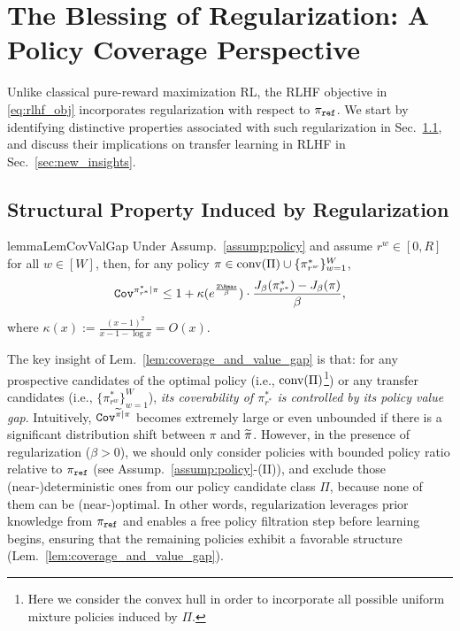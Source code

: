 \section{The Blessing of Regularization: A Policy Coverage Perspective}\label{sec:transfer_coverage_perspective}
Unlike classical pure-reward maximization RL, the RLHF objective in \eqref{eq:rlhf_obj} incorporates regularization with respect to $\pi_{\texttt{ref}}$.
We start by identifying distinctive properties associated with such regularization in Sec.~\ref{sec:new_structure}, and discuss their implications on transfer learning in RLHF in Sec.~\ref{sec:new_insights}.
%
%
%
%
%

\subsection{Structural Property Induced by Regularization}\label{sec:new_structure}
%
%
%
%
%
%
%
\begin{restatable}{lemma}{LemCovValGap}\label{lem:coverage_and_value_gap}
    Under Assump.~\ref{assump:policy} and assume $r^w\in[0,R]$ for all $w\in[W]$, then, for any policy $\pi\in\text{conv}(\Pi)\cup\{\pi^*_{r^w}\}_{w=1}^W$,
    \begin{align}
        \cov^{\pi^*_{r^*}|{\pi}} \leq 1 + \kappa(e^{\frac{2{\Rmax}}{\beta}}) \cdot \frac{J_\beta(\pi^*_{r^*}) - J_\beta({\pi})}{\beta},\label{eq:cov_value_gap}
    \end{align}
    where $\kappa(x) := \frac{(x-1)^2}{x-1- \log x} = O(x)$.
\end{restatable}
The key insight of Lem.~\ref{lem:coverage_and_value_gap} is that: for any prospective candidates of the optimal policy (i.e., $\text{conv}(\Pi)$\footnote{Here we consider the convex hull in order to incorporate all possible uniform mixture policies induced by $\Pi$.}) or any transfer candidates (i.e., $\{\pi^*_{r^w}\}_{w=1}^W$), \emph{its coverability of $\pi^*_{r^*}$ is controlled by its policy value gap}.
Intuitively, ${\texttt{Cov}}^{\widetilde{\pi}|\pi}$ becomes extremely large or even unbounded if there is a significant distribution shift between $\pi$ and $\widetilde{\pi}$.
However, in the presence of regularization ($\beta > 0$), we should only consider policies with bounded policy ratio relative to $\pi_{\texttt{ref}}$ (see Assump.~\ref{assump:policy}-(II)), and exclude those (near-)deterministic ones from our policy candidate class $\Pi$, because none of them can be (near-)optimal.
%
In other words, regularization leverages prior knowledge from $\pi_{\texttt{ref}}$ and enables a free policy filtration step before learning begins, ensuring that the remaining policies exhibit a favorable structure (Lem.~\ref{lem:coverage_and_value_gap}).

